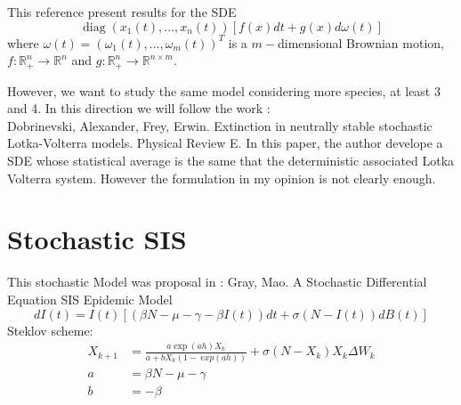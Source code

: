 \documentclass[review]{elsarticle}
\DeclareMathOperator{\diag}{diag}
\begin{document}
		This reference present results for the SDE  
		$$
			\diag(x_1(t),\dots, x_n(t))
			\left[
				f(x)dt + g(x)d\omega (t)
			\right]
		$$
		where $\omega(t) = (\omega_1(t),\dots, \omega_m(t))^T$ is a $m-$dimensional Brownian motion,
		$f: \mathbb{R}^n_+ \to \mathbb{R}^n$ and $g: \mathbb{R}^n_+ \to \mathbb{R}^{n \times m}$.
		
		However, we want to study the same model considering more species, at least 3 and 4. In this 
		direction we will follow the work \cite{Dobrinevski2012}: \\
		Dobrinevski, Alexander, Frey, Erwin.
		Extinction in neutrally stable stochastic Lotka-Volterra models.
		Physical Review E.
		In this paper, the author develope a SDE whose statistical average is the same that the deterministic
		associated Lotka Volterra system. 
		However the formulation in my opinion is not clearly enough.
		
	\section{Stochastic SIS}
		This stochastic Model was proposal in \cite{Gray2011}:
		Gray, Mao. A Stochastic Differential Equation SIS Epidemic Model
		\begin{equation}
			dI(t) = I(t)
				\left[
					\left(
						\beta N - \mu -\gamma - \beta I(t) 
					\right)
					dt
					+ \sigma (N -I(t)) dB(t)
				\right] 
		\end{equation}
		Steklov scheme:
		\begin{align*}
			X_{k+1} &= \frac{a \exp(a  h) X_k}{a + b X_k  (1 - \ exp(a h))}
			+ \sigma (N - X_k) X_k \Delta W_k\\
			a &= \beta N - \mu -\gamma\\
			b &= -\beta
		\end{align*}
\end{document}
